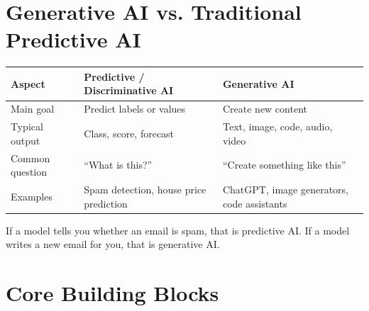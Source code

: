 \documentclass[11pt,a4paper]{article}
\begin{document}
\section{Generative AI vs. Traditional Predictive AI}

\begin{center}
\begin{tabular}{@{}p{4.1cm}p{4.1cm}p{4.4cm}@{}}
\toprule
\textbf{Aspect} & \textbf{Predictive / Discriminative AI} & \textbf{Generative AI} \\
\midrule
Main goal & Predict labels or values & Create new content \\
Typical output & Class, score, forecast & Text, image, code, audio, video \\
Common question & ``What is this?'' & ``Create something like this'' \\
Examples & Spam detection, house price prediction & ChatGPT, image generators, code assistants \\
\bottomrule
\end{tabular}
\end{center}

\begin{conceptbox}
If a model tells you whether an email is spam, that is predictive AI. If a model writes a new email for you, that is generative AI.
\end{conceptbox}

\section{Core Building Blocks}
\end{document}
